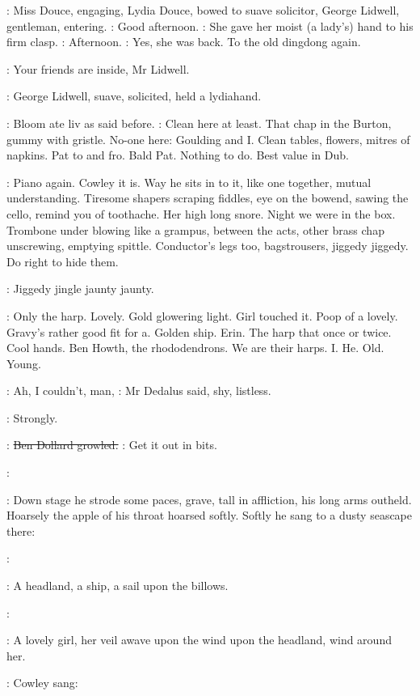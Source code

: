 :
Miss Douce,
engaging,
Lydia Douce,
bowed to suave solicitor,
George
Lidwell,
gentleman,
entering.
\lidwell:
Good afternoon.
:
She gave her moist (a lady's) hand to his firm clasp.
\MissD:
Afternoon.
:
Yes,
she was back.
To the old dingdong again.

\MissD:
Your friends are inside,
Mr Lidwell.

:
George Lidwell,
suave,
solicited,
held a lydiahand.

:
Bloom ate liv as said before.
\BloomInt:
Clean here at least.
That chap in the
Burton,
gummy with gristle.
No-one here:
Goulding and I.
Clean tables,
flowers,
mitres of napkins.
Pat to and fro.
Bald Pat.
Nothing to do.
Best
value in Dub.

\BloomInt:
Piano again.
Cowley it is.
Way he sits in to it,
like one together,
mutual understanding.
Tiresome shapers scraping fiddles,
eye on the
bowend,
sawing the cello,
remind you of toothache.
Her high long snore.
Night we were in the box.
Trombone under blowing like a grampus,
between the acts,
other brass chap unscrewing,
emptying spittle.
Conductor's legs too,
bagstrousers,
jiggedy jiggedy.
Do right to hide
them.

:
Jiggedy jingle jaunty jaunty.

\BloomInt:
Only the harp.
Lovely.
Gold glowering light.
Girl touched it.
Poop of
a lovely.
Gravy's rather good fit for a.
Golden ship.
Erin.
The harp that
once or twice.
Cool hands.
Ben Howth,
the rhododendrons.
We are their
harps.
I.
He.
Old.
Young.

\simon:
Ah,
I couldn't,
man,
:
Mr Dedalus said,
shy,
listless.

:
Strongly.

\dollard:
\sout{Ben Dollard growled.}
\dollard:
Get it out in bits.

\cowley:

:
Down stage he strode some paces,
grave,
tall in affliction,
his long
arms outheld.
Hoarsely the apple of his throat hoarsed softly.
Softly he
sang to a dusty seascape there:

\simon:

:
A headland,
a ship,
a
sail upon the billows.

\simon:

:
A lovely girl,
her veil awave upon the
wind upon the headland,
wind around her.

:
Cowley sang:

